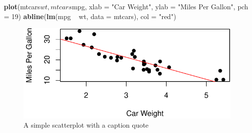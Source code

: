 \documentclass[12pt,a4paper,]{article}
\newenvironment{Shaded}{\begin{snugshade}}{\end{snugshade}}
\newcommand{\KeywordTok}[1]{\textcolor[rgb]{0.13,0.29,0.53}{\textbf{{#1}}}}
\newcommand{\DataTypeTok}[1]{\textcolor[rgb]{0.13,0.29,0.53}{{#1}}}
\newcommand{\DecValTok}[1]{\textcolor[rgb]{0.00,0.00,0.81}{{#1}}}
\newcommand{\StringTok}[1]{\textcolor[rgb]{0.31,0.60,0.02}{{#1}}}
\newcommand{\NormalTok}[1]{{#1}}
\begin{document}
\begin{Shaded}
\begin{Highlighting}[]
\KeywordTok{plot}\NormalTok{(mtcars$wt, mtcars$mpg, }\DataTypeTok{xlab =} \StringTok{"Car Weight"}\NormalTok{, }\DataTypeTok{ylab =} \StringTok{"Miles Per Gallon"}\NormalTok{, }
    \DataTypeTok{pch =} \DecValTok{19}\NormalTok{)}
\KeywordTok{abline}\NormalTok{(}\KeywordTok{lm}\NormalTok{(mpg ~}\StringTok{ }\NormalTok{wt, }\DataTypeTok{data =} \NormalTok{mtcars), }\DataTypeTok{col =} \StringTok{"red"}\NormalTok{)}
\end{Highlighting}
\end{Shaded}

\begin{figure}[htbp]
\centering
\includegraphics{article_files/figure-latex/unnamed-chunk-1-1.pdf}
\caption{A simple scatterplot with a caption quote}
\end{figure}

\newpage

\setlength{\parindent}{0cm} \setlength{\parskip}{6pt}


\end{document}
